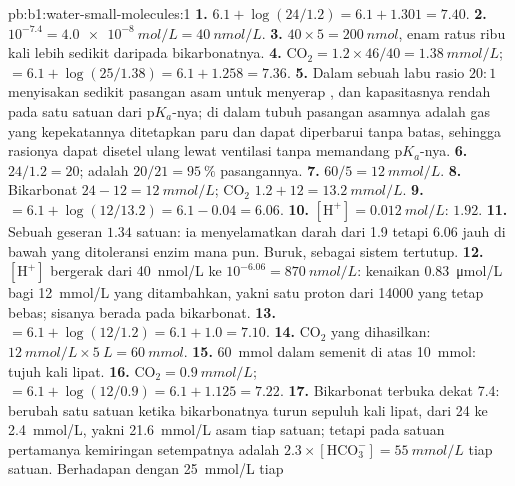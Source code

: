 \begin{solution}{pb:b1:water-small-molecules:1}
\textbf{1.} $6.1 + \log(24/1.2) = 6.1 + 1.301 = 7.40$.
\textbf{2.} $10^{-7.4} = \qty{4.0e-8}{mol/L} = \qty{40}{nmol/L}$.
\textbf{3.} $40\times 5 = \qty{200}{nmol}$, enam ratus ribu kali lebih
sedikit daripada bikarbonatnya.
\textbf{4.} $\mathrm{CO_2} = 1.2\times 46/40 = \qty{1.38}{mmol/L}$;
 $= 6.1 + \log(25/1.38) = 6.1 + 1.258 = 7.36$.
\textbf{5.} Dalam sebuah labu rasio $20:1$ menyisakan sedikit pasangan
asam untuk menyerap , dan kapasitasnya rendah pada satu satuan dari
p$K_a$-nya; di dalam tubuh pasangan asamnya adalah gas yang kepekatannya
ditetapkan paru dan dapat diperbarui tanpa batas, sehingga rasionya
dapat disetel ulang lewat ventilasi tanpa memandang p$K_a$-nya.
\textbf{6.} $24/1.2 = 20$;  adalah $20/21 = \qty{95}{\%}$ pasangannya.
\textbf{7.} $60/5 = \qty{12}{mmol/L}$.
\textbf{8.} Bikarbonat $24 - 12 = \qty{12}{mmol/L}$; $\mathrm{CO_2}$
$1.2 + 12 = \qty{13.2}{mmol/L}$.
\textbf{9.}  $= 6.1 + \log(12/13.2) = 6.1 - 0.04 = 6.06$.
\textbf{10.} $[\mathrm{H^+}] = \qty{0.012}{mol/L}$:  $1.92$.
\textbf{11.} Sebuah geseran $1.34$ satuan: ia menyelamatkan darah dari
 1.9 tetapi 6.06 jauh di bawah yang ditoleransi enzim mana pun.
Buruk, sebagai sistem tertutup.
\textbf{12.} $[\mathrm{H^+}]$ bergerak dari \qty{40}{nmol/L} ke $10^{-6.06} = \qty{870}{nmol/L}$: kenaikan \qty{0.83}{\micro mol/L} bagi \qty{12}{mmol/L} yang ditambahkan, yakni satu proton dari \num{14000} yang tetap bebas; sisanya berada pada bikarbonat.
\textbf{13.}  $= 6.1 + \log(12/1.2) = 6.1 + 1.0 = 7.10$.
\textbf{14.} $\mathrm{CO_2}$ yang dihasilkan: $\qty{12}{mmol/L}\times
\qty{5}{L} = \qty{60}{mmol}$.
\textbf{15.} \qty{60}{mmol} dalam semenit di atas \qty{10}{mmol}: tujuh
kali lipat.
\textbf{16.} $\mathrm{CO_2} = \qty{0.9}{mmol/L}$;  $= 6.1 +
\log(12/0.9) = 6.1 + 1.125 = 7.22$.
\textbf{17.} Bikarbonat terbuka dekat 7.4:  berubah satu satuan
ketika bikarbonatnya turun sepuluh kali lipat, dari \qty{24}{} ke
\qty{2.4}{mmol/L}, yakni \qty{21.6}{mmol/L} asam tiap satuan; tetapi
pada satuan pertamanya kemiringan setempatnya adalah
$2.3\times[\mathrm{HCO_3^-}] =
\qty{55}{mmol/L}$ tiap satuan. Berhadapan dengan \qty{25}{mmol/L} tiap

\end{solution}
